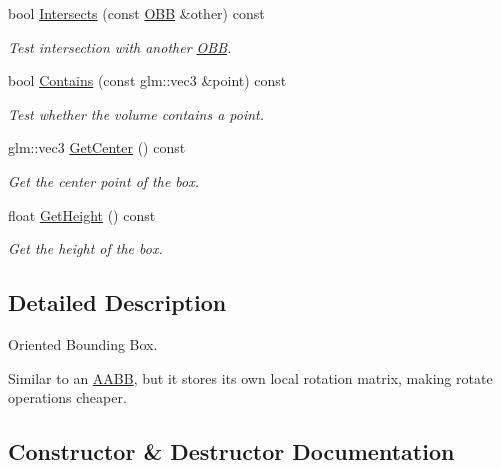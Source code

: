 \begin{DoxyCompactItemize}
bool \hyperlink{class_f_l_i_g_h_t_1_1_o_b_b_a02827ad2d8631acaca03b8d658152c2a}{Intersects} (const \hyperlink{class_f_l_i_g_h_t_1_1_o_b_b}{O\+BB} \&other) const
\begin{DoxyCompactList}\small\item\em Test intersection with another \hyperlink{class_f_l_i_g_h_t_1_1_o_b_b}{O\+BB}. \end{DoxyCompactList}\item 
bool \hyperlink{class_f_l_i_g_h_t_1_1_o_b_b_a07b87a6c611a251e3dd98ff83b72fe01}{Contains} (const glm\+::vec3 \&point) const
\begin{DoxyCompactList}\small\item\em Test whether the volume contains a point. \end{DoxyCompactList}\item 
glm\+::vec3 \hyperlink{class_f_l_i_g_h_t_1_1_o_b_b_a064497f85c7d383062f7011dd2888074}{Get\+Center} () const
\begin{DoxyCompactList}\small\item\em Get the center point of the box. \end{DoxyCompactList}\item 
float \hyperlink{class_f_l_i_g_h_t_1_1_o_b_b_a9216292dc4795cea396b228e12d6dc85}{Get\+Height} () const
\begin{DoxyCompactList}\small\item\em Get the height of the box. \end{DoxyCompactList}\end{DoxyCompactItemize}


\subsection{Detailed Description}
Oriented Bounding Box. 

Similar to an \hyperlink{class_f_l_i_g_h_t_1_1_a_a_b_b}{A\+A\+BB}, but it stores its own local rotation matrix, making rotate operations cheaper. 

\subsection{Constructor \& Destructor Documentation}
\mbox{\label{class_f_l_i_g_h_t_1_1_o_b_b_aa1709a538455c1fea5b62638eaae6830}} 
